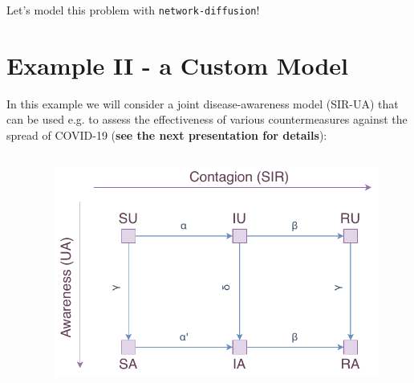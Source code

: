 \documentclass{beamer}
\begin{document}
\begin{frame}{\secname}
    \begin{center}
        \large Let's model this problem with \lstinline[style=py]{network-diffusion}!
    \end{center}
\end{frame}

\section{Example II - a Custom Model}

\begin{frame}{\secname}
    In this example we will consider a joint disease-awareness model (SIR-UA) that can be used e.g.
    to assess the effectiveness of various countermeasures against the spread of COVID-19 
    (\textbf{see the next presentation for details}):
    \begin{columns}[T]
        \captionsetup{font=scriptsize}
        \begin{column}{.5\textwidth}
            \begin{table}
            \centering
            \caption{Transition weights with explanation.}
            \end{table}
        \end{column}
        \begin{column}{0.5\textwidth}
        \begin{figure}
            \centering
            \includegraphics[width=\textwidth]{figures/sir_ua.pdf}

\end{figure}
\end{column}
\end{columns}
\end{frame}
\end{document}
